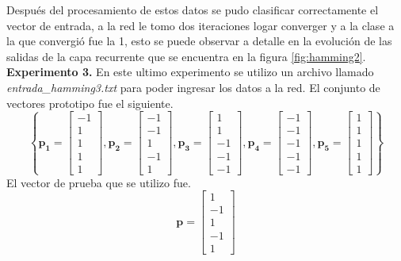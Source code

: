 \documentclass[12pt, titlepage]{article}
\begin{document}
        Después del procesamiento de estos datos se pudo clasificar correctamente el vector de entrada, a la red le tomo dos iteraciones logar converger y a la clase a la que convergió fue la 1, esto se puede observar a detalle en la evolución de las salidas de la capa recurrente que se encuentra en la figura \ref{fig:hamming2}.
        \newline
        \textbf{Experimento 3.} En este ultimo experimento se utilizo un archivo llamado \emph{entrada\_hamming3.txt} para poder ingresar los datos a la red. El conjunto de vectores prototipo fue el siguiente.
        \[ \left\lbrace \boldsymbol{p_1} = \left[\begin{array}{c}-1\\ 1\\ 1 \\ 1 \\ 1 \end{array}\right], \boldsymbol{p_2} = \left[\begin{array}{c}-1\\ -1\\ 1 \\ -1 \\ 1 \end{array}\right], \boldsymbol{p_3} = \left[\begin{array}{c}1\\ 1\\ -1 \\ -1 \\ -1 \end{array}\right], \boldsymbol{p_4} = \left[\begin{array}{c}-1\\ -1\\ -1 \\ -1 \\ -1 \end{array}\right], \boldsymbol{p_5} = \left[\begin{array}{c}1\\ 1\\ 1 \\ 1 \\ 1 \end{array}\right] \right\rbrace \]
        El vector de prueba que se utilizo fue.
        \[ \boldsymbol{p} = \left[\begin{array}{c}1\\ -1\\ 1 \\ -1 \\ 1\end{array}\right] \]
\end{document}
